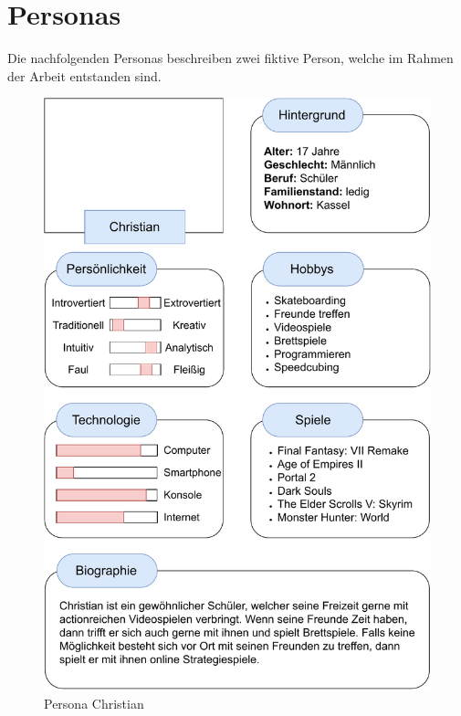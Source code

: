 \section{Personas}
Die nachfolgenden Personas beschreiben zwei fiktive Person, welche im Rahmen der Arbeit entstanden sind.

\begin{figure}[H]
  \centering
  \includegraphics[width=0.83\columnwidth]{figures/Persona1.pdf}
  \caption{\label{fig:Persona1} Persona Christian}
\end{figure}


